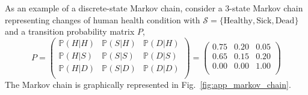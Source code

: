 As an example of a discrete-state Markov chain, consider a $3$-state Markov chain representing changes of human health condition with $\mathcal{S} = \{\text{Healthy}, \text{Sick}, \text{Dead}\}$ and a transition probability matrix $P$,
\begin{equation}
  P =  
    \begin{pmatrix}
      \mathbb{P}(H | H)  & \mathbb{P}(S | H) & \mathbb{P}(D | H)\\
      \mathbb{P}(H | S)  & \mathbb{P}(S | S) & \mathbb{P}(D | S)\\
      \mathbb{P}(H | D)  & \mathbb{P}(S | D) & \mathbb{P}(D | D)\\
    \end{pmatrix} =
		\begin{pmatrix}
		  0.75  & 0.20 & 0.05\\
      0.65  & 0.15 & 0.20\\
      0.00  & 0.00 & 1.00\\
		\end{pmatrix}
\label{eq:app_transition_probability_matrix}
\end{equation}
The Markov chain is graphically represented in Fig.~\ref{fig:app_markov_chain}.
